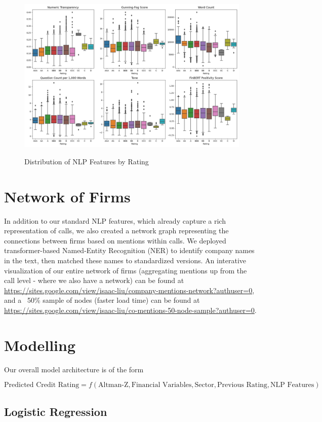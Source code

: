 \documentclass{article}[11pt]
\begin{document}
    \begin{figure}[h!]
		\centering
        \caption{Distribution of NLP Features by Rating}
        \includegraphics[width=0.6\linewidth,keepaspectratio=true]{../Output/NLP/hist_by_rating.png}
        \label{fig:dist-nlp-by-rating}
	\end{figure}

    \section*{Network of Firms}

    In addition to our standard NLP features, which already capture a rich representation of calls, we also created a network graph representing the connections between firms based on mentions within calls. We deployed transformer-based Named-Entity Recognition (NER) \citep{spacy_spacy_2024} to identify company names in the text, then matched these names to standardized versions. An interative visualization of our entire network of firms (aggregating mentions up from the call level - where we also have a network) can be found at \url{https://sites.google.com/view/isaac-liu/company-mentions-network?authuser=0}, and a ~50\% sample of nodes (faster load time) can be found at \url{https://sites.google.com/view/isaac-liu/co-mentions-50-node-sample?authuser=0}.

    \section*{Modelling}

    Our overall model architecture is of the form

    \begin{equation*}
        \text{Predicted Credit Rating} = f(\text{Altman-Z}, \text{Financial Variables}, \text{Sector}, \text{Previous Rating}, \text{NLP Features})
    \end{equation*}

    \subsection*{Logistic Regression}
\end{document}
